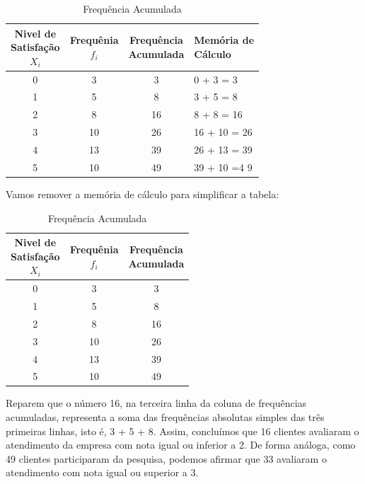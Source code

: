\begin{table}
    \centering
    \begin{tabular}{cccl}
        \toprule
        \shortstack{Nivel de \\Satisfação \\\(X_i\)} & \shortstack{Frequênia \\\(f_i\)} & \shortstack{Frequência \\Acumulada} &\shortstack{Memória de \\Cálculo}\\
        \midrule
        0 & 3&  3&  0 + 3 = 3\\
        1 & 5&  8&  3 + 5 = 8\\
        2 & 8&  16& 8 + 8 = 16\\
        3 & 10& 26& 16 + 10 = 26\\
        4 & 13& 39& 26 + 13 = 39\\
        5 & 10& 49& 39 + 10 =4 9\\
        \bottomrule
    \end{tabular}
    \caption{Frequência Acumulada}
\end{table}

Vamos remover a memória de cálculo para simplificar a tabela:

\begin{table}
    \centering
    \begin{tabular}{ccc}
        \toprule
        \shortstack{Nivel de \\Satisfação \\\(X_i\)} & \shortstack{Frequênia \\\(f_i\)} & \shortstack{Frequência \\Acumulada}\\
        \midrule
        0 & 3&  3\\
        1 & 5&  8\\
        2 & 8&  16\\
        3 & 10& 26\\
        4 & 13& 39\\
        5 & 10& 49\\
        \bottomrule
    \end{tabular}
    \caption{Frequência Acumulada}
\end{table}
Reparem que o número 16, na terceira linha da coluna de frequências acumuladas, representa a soma das frequências absolutas simples das três primeiras linhas, isto é, 3 + 5 + 8. Assim, concluímos que 16 clientes avaliaram o atendimento da empresa com nota igual ou inferior a 2. De forma análoga, como 49 clientes
participaram da pesquisa, podemos afirmar que 33 avaliaram o atendimento com nota igual ou superior a 3.

